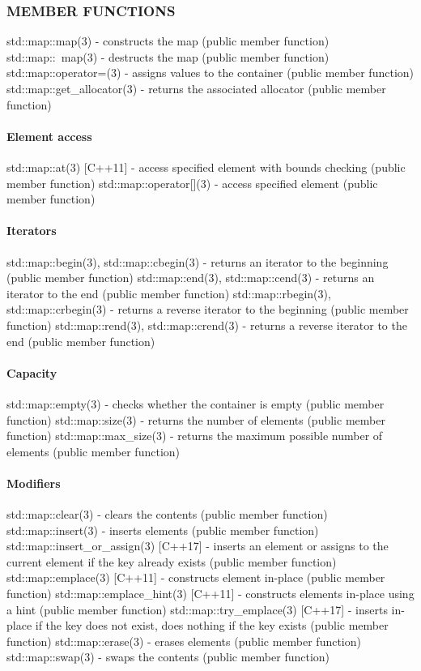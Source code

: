 \subsubsection{MEMBER FUNCTIONS}
std::map::map(3) - constructs the map  (public member function)
std::map::~map(3) - destructs the map  (public member function)
std::map::operator=(3) - assigns values to the container   (public member function)
std::map::get\_allocator(3) - returns the associated allocator   (public member function)
\paragraph{Element access}
std::map::at(3) [C++11] - access specified element with bounds checking   (public member function)
std::map::operator[](3) - access specified element   (public member function)
\paragraph{Iterators}
std::map::begin(3), std::map::cbegin(3) - returns an iterator to the beginning   (public member function)
std::map::end(3), std::map::cend(3) - returns an iterator to the end   (public member function)
std::map::rbegin(3), std::map::crbegin(3) - returns a reverse iterator to the beginning   (public member function)
std::map::rend(3), std::map::crend(3) - returns a reverse iterator to the end   (public member function)
\paragraph{Capacity}
std::map::empty(3) - checks whether the container is empty   (public member function)
std::map::size(3) - returns the number of elements   (public member function)
std::map::max\_size(3) - returns the maximum possible number of elements   (public member function)
\paragraph{Modifiers}
std::map::clear(3) - clears the contents   (public member function)
std::map::insert(3) - inserts elements   (public member function)
std::map::insert\_or\_assign(3) [C++17] - inserts an element or assigns to the current element if the key already exists   (public member function)
std::map::emplace(3) [C++11] - constructs element in-place   (public member function)
std::map::emplace\_hint(3) [C++11] - constructs elements in-place using a hint   (public member function)
std::map::try\_emplace(3) [C++17] - inserts in-place if the key does not exist, does nothing if the key exists  (public member function)
std::map::erase(3) - erases elements   (public member function)
std::map::swap(3) - swaps the contents   (public member function)
